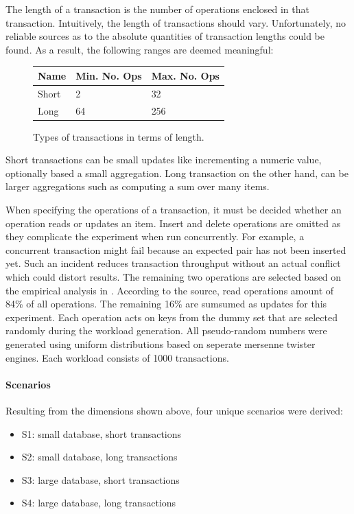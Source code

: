 The length of a transaction is the number of operations enclosed in that
transaction. Intuitively, the length of transactions should vary. Unfortunately,
no reliable sources as to the absolute quantities of transaction lengths could
be found. As a result, the following ranges are deemed meaningful:

\begin{figure}[!h]
    \centering
    \begin{tabular}{|l|l|l|}
        \hline
        \textbf{Name} & \textbf{Min. No. Ops} & \textbf{Max. No. Ops} \\
        \hline
        Short         & 2  & 32  \\
        Long          & 64 & 256 \\
        \hline
    \end{tabular}
    \caption{Types of transactions in terms of length.}
    \label{tab:tx-length}
\end{figure}

Short transactions can be small updates like incrementing a numeric value,
optionally based a small aggregation. Long transaction on the other hand, can be
larger aggregations such as computing a sum over many items.

When specifying the operations of a transaction, it must be decided whether an
operation reads or updates an item. Insert and delete operations are omitted as
they complicate the experiment when run concurrently. For example, a concurrent
transaction might fail because an expected pair has not been inserted yet. Such
an incident reduces transaction throughput without an actual conflict which
could distort results. The remaining two operations are selected based on the
empirical analysis in \cite{andrei2017sap}. According to the source, read
operations amount of 84\% of all operations. The remaining 16\% are sumsumed as
updates for this experiment. Each operation acts on keys from the dummy set that
are selected randomly during the workload generation. All pseudo-random numbers
were generated using uniform distributions based on seperate mersenne twister
engines. Each workload consists of 1000 transactions.

\paragraph{Scenarios}

Resulting from the dimensions shown above, four unique scenarios  were derived:

\begin{itemize}
    \item S1: small database, short transactions
    \item S2: small database, long transactions
    \item S3: large database, short transactions
    \item S4: large database, long transactions
\end{itemize}

